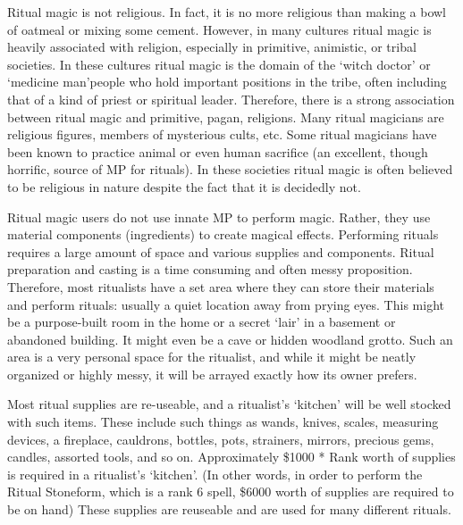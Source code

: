 \documentclass[twoside]{book}
\begin{document}
    {  
      Ritual magic is not religious. In fact, it is no
               more religious than making a bowl of oatmeal or mixing
               some cement. However, in many cultures ritual magic is
               heavily associated with religion, especially in primitive,
               animistic, or tribal societies. In these cultures ritual
               magic is the domain of the `witch doctor' or
               `medicine man'people who hold important
               positions in the tribe, often including that of a kind of
               priest or spiritual leader. Therefore, there is a strong
               association between ritual magic and primitive, pagan,
               religions. Many ritual magicians are religious figures,
               members of mysterious cults, etc. Some ritual magicians
               have been known to practice animal or even human sacrifice
               (an excellent, though horrific, source of MP for rituals).
               In these societies ritual magic is often believed to be
               religious in nature despite the fact that it is decidedly
               not. 
    }
  
    {  
      Ritual magic users do not use innate MP to perform
               magic. Rather, they use material components (ingredients)
               to create magical effects. Performing rituals requires a
               large amount of space and various supplies and components.
               Ritual preparation and casting is a time consuming and
               often messy proposition. Therefore, most ritualists have a
               set area where they can store their materials and perform
               rituals: usually a quiet location away from prying eyes.
               This might be a purpose-built room in the home or a secret
               `lair' in a basement or abandoned building. It
               might even be a cave or hidden woodland grotto. Such an
               area is a very personal space for the ritualist, and while
               it might be neatly organized or highly messy, it will be
               arrayed exactly how its owner prefers. 
    }
  
    {  
      Most ritual supplies are re-useable, and a
               ritualist's `kitchen' will be well
               stocked with such items. These include such things as
               wands, knives, scales, measuring devices, a fireplace,
               cauldrons, bottles, pots, strainers, mirrors, precious
               gems, candles, assorted tools, and so on. Approximately
               \$1000 * Rank worth of supplies is required in a
               ritualist's `kitchen'. (In other words,
               in order to perform the Ritual Stoneform, which is a rank
               6 spell, \$6000 worth of supplies are required to be on
               hand) These supplies are reuseable and are used for many
               different rituals. 
    }
  
\end{document}
